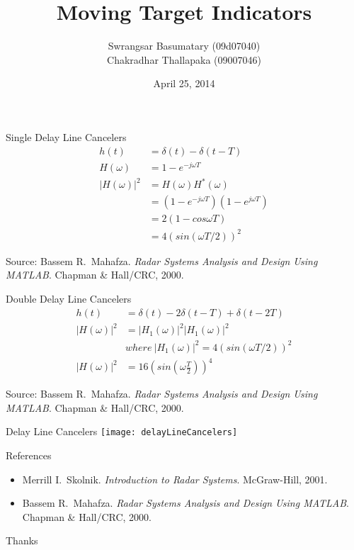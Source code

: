 \documentclass[mathserif]{beamer}
\title{Moving Target Indicators}
\author{Swrangsar Basumatary (09d07040) \\ Chakradhar Thallapaka (09007046)}
\institute{Department of Electrical Engineering \\ IIT Bombay, Powai}
\date{April 25, 2014}
\begin{document}
    \frame{\titlepage}
    
    \begin{frame}{Single Delay Line Cancelers}
    	\begin{align}
    	 h(t) & = \delta(t) - \delta(t-T) \nonumber \\
    	 H(\omega) & = 1 - e^{-j\omega T} \nonumber \\
    	 |H(\omega)|^2 & = H(\omega)H^*(\omega) \nonumber \\
    	 & = (1 - e^{-j\omega T})(1 - e^{j\omega T}) \nonumber \\
    	 & = 2(1-cos\omega T) \nonumber \\
    	 & = 4(sin(\omega T/2))^2 \nonumber
    	\end{align}
    	
    	\vfill
    	\tiny{Source: Bassem R.~Mahafza. \emph{Radar Systems Analysis and Design Using MATLAB\textsuperscript{\textregistered}}. Chapman \& Hall/CRC, 2000.}

    \end{frame}
    
    
    \begin{frame}{Double Delay Line Cancelers}
      \begin{align}
       h(t) & = \delta(t) - 2\delta(t-T) + \delta(t-2T) \nonumber \\
       |H(\omega)|^2 & = |H_1(\omega)|^2|H_1(\omega)|^2 \nonumber \\
       & where~ |H_1(\omega)|^2 = 4(sin(\omega T/2))^2 \nonumber \\
       |H(\omega)|^2 & = 16\left(sin\left(\omega\frac{T}{2}\right)\right)^4 \nonumber
      \end{align}

      \vfill
    	\tiny{Source: Bassem R.~Mahafza. \emph{Radar Systems Analysis and Design Using MATLAB\textsuperscript{\textregistered}}. Chapman \& Hall/CRC, 2000.}

    \end{frame}

    
    \begin{frame}{Delay Line Cancelers}
    	\texttt{[image: delayLineCancelers]}
    \end{frame}
    
    
    
 
    
    \begin{frame}{References}
        
        \begin{itemize}
                 \item Merrill I.~Skolnik. \emph{Introduction to Radar Systems}. McGraw-Hill, 2001.
                 \item Bassem R.~Mahafza. \emph{Radar Systems Analysis and Design Using MATLAB\textsuperscript{\textregistered}}. Chapman \& Hall/CRC, 2000.
                 
        \end{itemize}
    \end{frame}
    
    
    \begin{frame}[c]
     \begin{center}
       \Huge Thanks
     \end{center}
    \end{frame}

    
\end{document}
